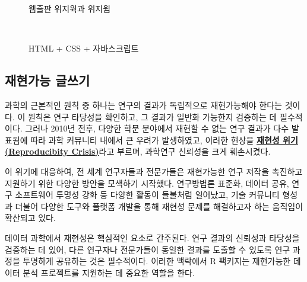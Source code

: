 \documentclass[
  letterpaper,
]{book}
\begin{document}
\begin{figure}
\begin{minipage}[t]{0.47\linewidth}
{{}

\caption{HTML + CSS + 자바스크립트}

}

\end{minipage}%
\newline
\begin{minipage}[t]{0.47\linewidth}

{\centering 

웹출판 위지윅과 위지윔

}

\end{minipage}%
%
\begin{minipage}[t]{0.05\linewidth}

{\centering 

~

}

\end{minipage}%

\end{figure}

\hypertarget{uxc7acuxd604uxac00uxb2a5-uxae00uxc4f0uxae30}{%
\subsection{재현가능
글쓰기}\label{uxc7acuxd604uxac00uxb2a5-uxae00uxc4f0uxae30}}

과학의 근본적인 원칙 중 하나는 연구의 결과가 독립적으로 재현가능해야
한다는 것이다. 이 원칙은 연구 타당성을 확인하고, 그 결과가 일반화
가능한지 검증하는 데 필수적이다. 그러나 2010년 전후, 다양한 학문
분야에서 재현할 수 없는 연구 결과가 다수 발표됨에 따라 과학 커뮤니티
내에서 큰 우려가 발생하였고, 이러한 현상을
\href{https://ko.wikipedia.org/wiki/\%EC\%9E\%AC\%ED\%98\%84\%EC\%84\%B1_\%EC\%9C\%84\%EA\%B8\%B0}{\textbf{재현성
위기(Reproducibity Crisis)}}라고 부르며, 과학연구 신뢰성을 크게
훼손시켰다.

이 위기에 대응하여, 전 세계 연구자들과 전문가들은 재현가능한 연구 저작을
촉진하고 지원하기 위한 다양한 방안을 모색하기 시작했다. 연구방법론
표준화, 데이터 공유, 연구 소프트웨어 투명성 강화 등 다양한 활동이
들불처럼 일어났고, 기술 커뮤니티 형성과 더불어 다양한 도구와 플랫폼
개발을 통해 재현성 문제를 해결하고자 하는 움직임이 확산되고 있다.

데이터 과학에서 재현성은 핵심적인 요소로 간주된다. 연구 결과의 신뢰성과
타당성을 검증하는 데 있어, 다른 연구자나 전문가들이 동일한 결과를 도출할
수 있도록 연구 과정을 투명하게 공유하는 것은 필수적이다. 이러한 맥락에서
R 팩키지는 재현가능한 데이터 분석 프로젝트를 지원하는 데 중요한 역할을
한다.
\end{document}
